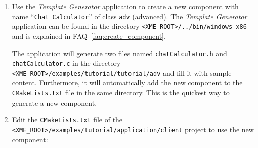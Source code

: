 \begin{enumerate}
	\item Use the \emph{Template Generator} application to create a new component with name ``\texttt{Chat Calculator}'' of class \verb|adv| (advanced).
		The \emph{Template Generator} application can be found in the directory \verb|<XME_ROOT>/../bin/windows_x86| and is explained in FAQ~\ref{faq:create_component}.
		
		The application will generate two files named \verb|chatCalculator.h| and \verb|chatCalculator.c|
		in the directory \verb|<XME_ROOT>/examples/tutorial/tutorial/adv| and fill it with sample content.
		Furthermore, it will automatically add the new component to the \verb|CMakeLists.txt| file in the same directory.
		This is the quickest way to generate a new \xme component.

%

%

	\item Edit the \verb|CMakeLists.txt| file of the \verb|<XME_ROOT>/examples/tutorial/application/client| project to use the new component:


\end{enumerate}
